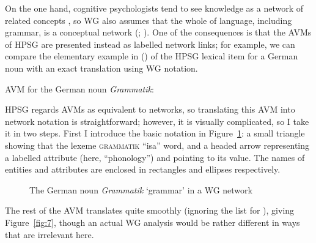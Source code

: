 \documentclass[output=paper
	        ,collection
	        ,collectionchapter
 	        ,biblatex
                ,babelshorthands
                ,newtxmath
                ,draftmode
                ,colorlinks, citecolor=brown
]{langscibook}
\begin{document}
On the one hand, cognitive psychologists tend to see knowledge as a network of related concepts \citep[252]{Reisberg2007}, so WG also assumes that the whole of language, including grammar, is a conceptual network (\citealt[1]{Hudson84a-u}; \citeyear[1]{Hudson2007a-u}). One of the consequences is that the AVMs of HPSG are presented instead as labelled network links; for example, we can compare the elementary example in () of the HPSG lexical item for a German noun \citep[264]{MuellerGT-Eng2} with an exact translation using WG notation.

\ea
\label{fig:5}
AVM for the German noun \emph{Grammatik}:\\
\z

HPSG regards AVMs as equivalent to networks, so translating this AVM into network notation is straightforward; however, it is visually complicated, so I take it in two steps. First I introduce the basic notation in Figure~\ref{fig:6}: a small triangle showing that the lexeme \textsc{grammatik} ``isa'' word, and a headed arrow representing a labelled attribute (here, ``phonology'') and pointing to its value. The names of entities and attributes are enclosed in rectangles and ellipses respectively.

\begin{figure}
	\centering
{}
	\caption{The German noun \emph{Grammatik} ‘grammar’ in a WG network}
	\label{fig:6}
\end{figure}

The rest of the AVM translates quite smoothly (ignoring the list for \spr), giving Figure~\ref{fig:7}, though an actual WG analysis would be rather different in ways that are irrelevant here.
\end{document}
